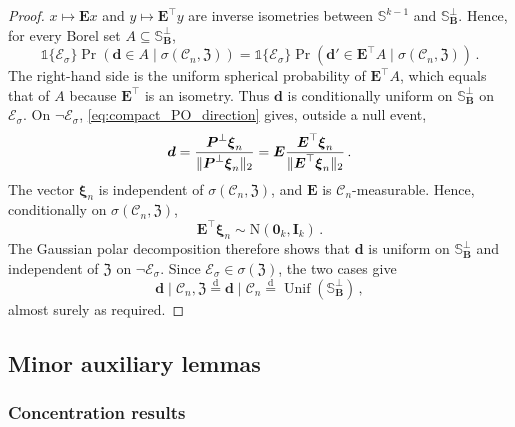 \documentclass{article}
\makeatletter
\theoremstyle{definition}
\newcommand{\vnorm}[1]{%
	\ensuremath{%
		\if@display
		\left\| #1 \right\|
		\else
		\| #1 \|
		\fi
	}%
}
\newcommand*{\bb}{\boldsymbol}
\makeatother
\begin{document}
\begin{bibunit}
\begin{proof}
$x\mapsto\bb E x$ and $y\mapsto\bb E^\top y$ are inverse isometries between
$\mathbb S^{k-1}$ and $\mathbb S_{\bb B}^\perp$. Hence, for every Borel set
$A\subseteq\mathbb S_{\bb B}^\perp$,
$$
    \mathds{1}\{\mathcal E_\sigma\}
    \Pr\left(
        \bb d\in A
        \mid
        \sigma(\mathcal C_n,\bb{\mathfrak Z})
    \right)
    =
    \mathds{1}\{\mathcal E_\sigma\}
    \Pr\left(
        \bb d'\in\bb E^\top A
        \mid
        \sigma(\mathcal C_n,\bb{\mathfrak Z})
    \right) \,. 
$$
The right-hand side is the uniform spherical probability of
$\bb E^\top A$, which equals that of $A$ because $\bb E^\top$ is an
isometry. Thus $\bb d$ is conditionally uniform on
$\mathbb S_{\bb B}^\perp$ on $\mathcal E_\sigma$.
On $\lnot \mathcal E_\sigma$, \eqref{eq:compact_PO_direction} gives, outside a
null event,
$$
    \bb d
    =
    \frac{
        \bb P^\perp\bb\xi_n
    }{
        \vnorm{\bb P^\perp\bb\xi_n}_2
    }
    =
    \bb E
    \frac{
        \bb E^\top\bb\xi_n
    }{
        \vnorm{\bb E^\top\bb\xi_n}_2
    }\,.
$$
The vector $\bb\xi_n$ is independent of
$\sigma(\mathcal C_n,\bb{\mathfrak Z})$, and $\bb E$ is
$\mathcal C_n$-measurable. Hence, conditionally on
$\sigma(\mathcal C_n,\bb{\mathfrak Z})$,
$$
    \bb E^\top\bb\xi_n
    \sim
    \mathrm N(\bb0_k,\bb I_k)\,.
$$
The Gaussian polar decomposition
\citep[Exercise~3.3.7]{vershynin:2018} therefore shows that $\bb d$ is
uniform on $\mathbb S_{\bb B}^\perp$ and independent of
$\bb{\mathfrak Z}$ on $\lnot \mathcal E_\sigma$.
Since $\mathcal E_\sigma\in\sigma(\bb{\mathfrak Z})$, the two cases give
$$
        \bb d
       \mid
        \mathcal C_n,\bb{\mathfrak Z}
    \overset{\mathrm d}{=}
        \bb d
       \mid
        \mathcal C_n
    \overset{\mathrm d}{=}
    \operatorname{Unif}
    \left(
        \mathbb S_{\bb B}^\perp
    \right)\,,
$$
almost surely as required.
\end{proof}

\subsection{Minor auxiliary lemmas}



\subsubsection{Concentration results}


\end{bibunit}
\end{document}
